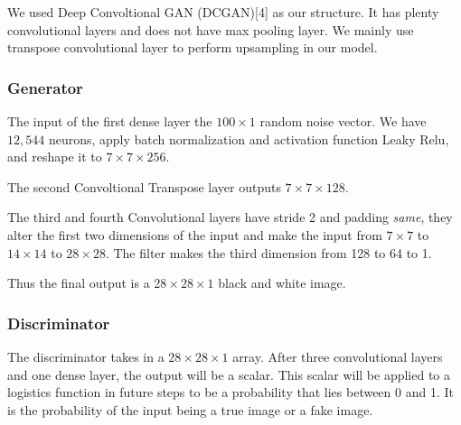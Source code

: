 \documentclass{article}
\begin{document}
We used Deep Convoltional GAN (DCGAN)[4] as our structure.
It has plenty convolutional layers and does not have max pooling layer.
We mainly use transpose convolutional layer to perform upsampling in our model.

\subsubsection{Generator}

The input of the first dense layer the $100\times 1$ random noise vector. 
We have $12,544$ neurons, apply batch normalization and activation function Leaky Relu, and reshape it to $7\times 7\times 256$.

The second Convoltional Transpose layer outputs $7\times 7\times 128$.

The third and fourth Convolutional layers have stride 2 and padding \textit{same}, they alter the first two dimensions of the input and make the input from $7\times 7$ to $14\times 14$ to $28\times 28$.
The filter makes the third dimension from 128 to 64 to 1.

Thus the final output is a $28\times 28\times 1$ black and white image.

\subsubsection{Discriminator}

The discriminator takes in a $28\times 28\times 1$ array. After three convolutional layers and one dense layer, the output will be a scalar.
This scalar will be applied to a logistics function in future steps to be a probability that lies between 0 and 1. It is the probability of the input being a true image or a fake image.
\end{document}
